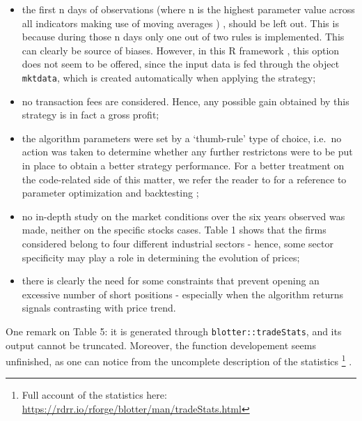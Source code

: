 \documentclass[
  11pt,
]{article}
\begin{document}
\begin{itemize}
\item
  the first n days of observations (where n is the highest parameter
  value across all indicators making use of moving averages ) , should
  be left out. This is because during those n days only one out of two
  rules is implemented. This can clearly be source of biases. However,
  in this R framework , this option does not seem to be offered, since
  the input data is fed through the object \texttt{mktdata}, which is
  created automatically when applying the strategy;
\item
  no transaction fees are considered. Hence, any possible gain obtained
  by this strategy is in fact a gross profit;
\item
  the algorithm parameters were set by a `thumb-rule' type of choice,
  i.e.~no action was taken to determine whether any further restrictons
  were to be put in place to obtain a better strategy performance. For a
  better treatment on the code-related side of this matter, we refer the
  reader to \citet{Trice2016} for a reference to parameter optimization
  and backtesting ;
\item
  no in-depth study on the market conditions over the six years observed
  was made, neither on the specific stocks cases. Table 1 shows that the
  firms considered belong to four different industrial sectors - hence,
  some sector specificity may play a role in determining the evolution
  of prices;
\item
  there is clearly the need for some constraints that prevent opening an
  excessive number of short positions - especially when the algorithm
  returns signals contrasting with price trend.
\end{itemize}

One remark on Table 5: it is generated through
\texttt{blotter::tradeStats}, and its output cannot be truncated.
Moreover, the function developement seems unfinished, as one can notice
from the uncomplete description of the statistics \footnote{Full account
  of the statistics here:
  \url{https://rdrr.io/rforge/blotter/man/tradeStats.html}} .
\end{document}

